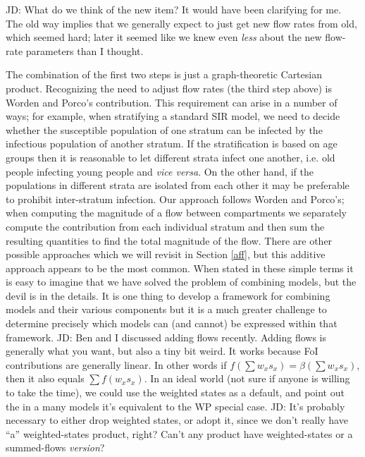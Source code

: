 \documentclass[pdflatex,sn-basic]{sn-jnl}%
\theoremstyle{definition}
\newcommand{\ben}[1]{{\color{brown} BB: #1}}
\newcommand{\df}[1]{{\color{orange} DF: #1}}
\newcommand{\jd}[1]{{\color{blue} JD: #1}}
\newcommand{\vv}{{\emph{vice versa}\xspace}}
\providecommand{\DIFaddbegin}{} %
\providecommand{\DIFaddend}{} %
\providecommand{\DIFdelbegin}{} %
\providecommand{\DIFdelend}{} %
\newcommand{\DIFscaledelfig}{0.5}
\newlength{\DIFdelgraphicswidth} %
\newlength{\DIFdelgraphicsheight} %
\newcommand{\DIFaddincludegraphics}[2][]{{\color{blue}\fbox{\DIFOincludegraphics[#1]{#2}}}} %
\newcommand{\DIFdelincludegraphics}[2][]{%
\sbox{\DIFdelgraphicsbox}{\DIFOincludegraphics[#1]{#2}}%
\settoboxwidth{\DIFdelgraphicswidth}{\DIFdelgraphicsbox} %
\settoboxtotalheight{\DIFdelgraphicsheight}{\DIFdelgraphicsbox} %
\scalebox{\DIFscaledelfig}{%
\parbox[b]{\DIFdelgraphicswidth}{\usebox{\DIFdelgraphicsbox}\\[-\baselineskip] \rule{\DIFdelgraphicswidth}{0em}}\llap{\resizebox{\DIFdelgraphicswidth}{\DIFdelgraphicsheight}{%
\setlength{\unitlength}{\DIFdelgraphicswidth}%
\begin{picture}(1,1)%
\thicklines\linethickness{2pt} %
{\color[rgb]{1,0,0}\put(0,0){\framebox(1,1){}}}%
{\color[rgb]{1,0,0}\put(0,0){\line( 1,1){1}}}%
{\color[rgb]{1,0,0}\put(0,1){\line(1,-1){1}}}%
\end{picture}%
}\hspace*{3pt}}} %
} %
\DeclareRobustCommand{\DIFaddbegin}{\DIFOaddbegin \let\includegraphics\DIFaddincludegraphics} %
\DeclareRobustCommand{\DIFaddend}{\DIFOaddend \let\includegraphics\DIFOincludegraphics} %
\DeclareRobustCommand{\DIFdelbegin}{\DIFOdelbegin \let\includegraphics\DIFdelincludegraphics} %
\DeclareRobustCommand{\DIFdelend}{\DIFOaddend \let\includegraphics\DIFOincludegraphics} %
\begin{document}

\DIFdelend \DIFaddbegin \jd{What do we think of the new item? It would have been clarifying for me. The old way implies that we generally expect to just get new flow rates from old, which seemed hard; later it seemed like we knew even \emph{less} about the new flow-rate parameters than I thought.}
\DIFaddend 

The combination of the first two steps is just a graph-theoretic Cartesian product. Recognizing the need to adjust flow rates (the third step above) is Worden and Porco's contribution. This requirement can arise in a number of ways; for example, when stratifying a standard SIR model, we need to decide whether the susceptible population of one stratum can be infected by the infectious population of another stratum.
\DIFdelbegin %
\DIFdelend If the stratification is based on age groups then it is reasonable to let different strata infect one another, i.e. old people infecting young people and \vv. On the other hand, if the populations in different strata are isolated from each other it may be preferable to prohibit inter-stratum infection. Our approach follows Worden and Porco's; when computing the magnitude of a flow between compartments we separately compute the contribution from each individual stratum and then sum the resulting quantities to find the total magnitude of the flow. There are other possible approaches which we will revisit in Section \ref{aff}, but this additive approach appears to be the most common. When stated in these simple terms it is easy to imagine that we have solved the problem of combining models, but the devil is in the details. It is one thing to develop a framework for combining models and their various components but it is a much greater challenge to determine precisely which models can (and cannot) be expressed within that framework. 
\DIFaddbegin \jd{Ben and I discussed adding flows recently. Adding flows is generally what you want, but also a tiny bit weird. It works because FoI contributions are generally linear. In other words if $f(\sum w_x s_x) = \beta(\sum w_x s_x)$, then it also equals $\sum f(w_x s_x)$. In an ideal world (not sure if anyone is willing to take the time), we could use the weighted states as a default, and point out the in a many models it's equivalent to the WP special case.}
\jd{It's probably necessary to either drop weighted states, or adopt it, since we don't really have “a” weighted-states product, right? Can't any product have weighted-states or a summed-flows \emph{version}?}
\DIFaddend 
\end{document}
